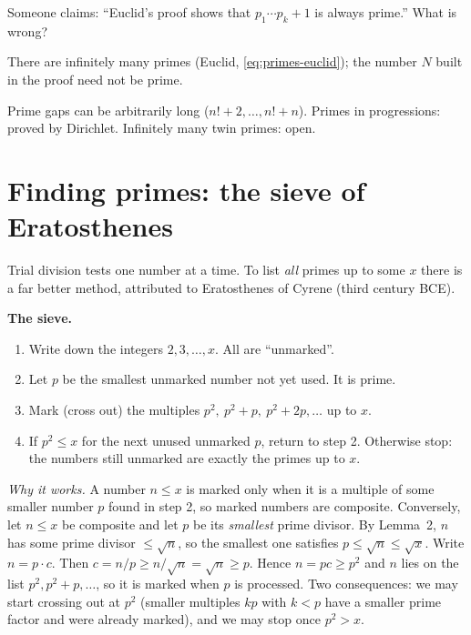 \begin{checkpoint}
Someone claims: ``Euclid's proof shows that $p_1\cdots p_k+1$ is always prime.'' What is wrong?
\end{checkpoint}

\begin{keyideas}
\item There are infinitely many primes (Euclid, \cref{eq:primes-euclid}); the number $N$ built in the proof need not be prime.
\item Prime gaps can be arbitrarily long ($n!+2,\dots,n!+n$). Primes in progressions: proved by Dirichlet. Infinitely many twin primes: open.
\end{keyideas}

\section{Finding primes: the sieve of Eratosthenes}\label{sec:primes-sieve}

Trial division tests one number at a time. To list \emph{all} primes up to some $x$ there is a far better method, attributed to Eratosthenes of Cyrene (third century BCE).

\textbf{The sieve.}
\begin{enumerate}
\item Write down the integers $2,3,\dots,x$. All are ``unmarked''.
\item Let $p$ be the smallest unmarked number not yet used. It is prime.
\item Mark (cross out) the multiples $p^2,\ p^2+p,\ p^2+2p,\dots$ up to $x$.
\item If $p^2\le x$ for the next unused unmarked $p$, return to step 2. Otherwise stop: the numbers still unmarked are exactly the primes up to $x$.
\end{enumerate}

\emph{Why it works.} A number $n\le x$ is marked only when it is a multiple of some smaller number $p$ found in step 2, so marked numbers are composite. Conversely, let $n\le x$ be composite and let $p$ be its \emph{smallest} prime divisor. By Lemma~2, $n$ has some prime divisor $\le\sqrt n$, so the smallest one satisfies $p\le\sqrt n\le\sqrt x$. Write $n=p\cdot c$. Then $c=n/p\ge n/\sqrt n=\sqrt n\ge p$. Hence $n=pc\ge p^2$ and $n$ lies on the list $p^2,p^2+p,\dots$, so it is marked when $p$ is processed. Two consequences: we may start crossing out at $p^2$ (smaller multiples $kp$ with $k<p$ have a smaller prime factor and were already marked), and we may stop once $p^2>x$.

